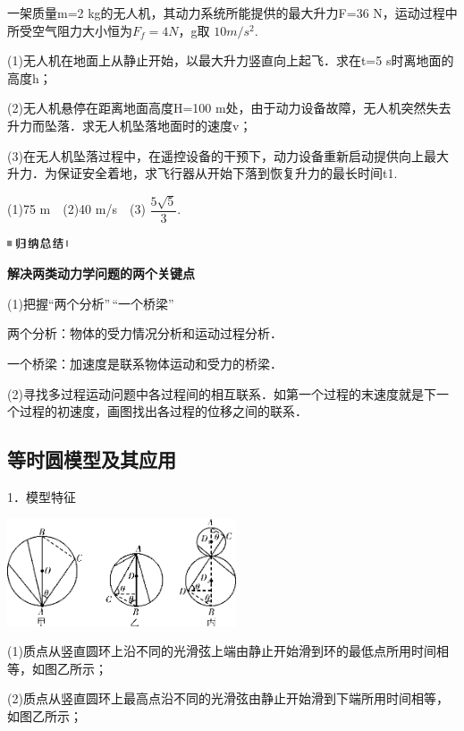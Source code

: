 \documentclass[cn,10.5pt,chinese,mac,chinesefont=founder]{elegantbook}
\begin{document}
一架质量m=2 kg的无人机，其动力系统所能提供的最大升力F=36
N，运动过程中所受空气阻力大小恒为$F_f=4 N$，g取 $10m/s^2$.

(1)无人机在地面上从静止开始，以最大升力竖直向上起飞．求在t=5
s时离地面的高度h；

(2)无人机悬停在距离地面高度H=100
m处，由于动力设备故障，无人机突然失去升力而坠落．求无人机坠落地面时的速度v；

(3)在无人机坠落过程中，在遥控设备的干预下，动力设备重新启动提供向上最大升力．为保证安全着地，求飞行器从开始下落到恢复升力的最长时间t1.
\begin{solution}
	(1)75 m　(2)40 m/s　(3) $\dfrac{5\sqrt{5}}{3}$.
\end{solution}


\begin{center}\includegraphics[width=0.70833in,height=0.125in]{media/image13.png}

\textbf{解决两类动力学问题的两个关键点}
\end{center}


(1)把握``两个分析''\,``一个桥梁''

两个分析：物体的受力情况分析和运动过程分析．

一个桥梁：加速度是联系物体运动和受力的桥梁．

(2)寻找多过程运动问题中各过程间的相互联系．如第一个过程的末速度就是下一个过程的初速度，画图找出各过程的位移之间的联系．

\subsection{等时圆模型及其应用}

1．模型特征

\begin{center}\includegraphics[width=2.66667in,height=1.25in]{media/image107.png}\end{center}

(1)质点从竖直圆环上沿不同的光滑弦上端由静止开始滑到环的最低点所用时间相等，如图乙所示；

(2)质点从竖直圆环上最高点沿不同的光滑弦由静止开始滑到下端所用时间相等，如图乙所示；
\end{document}
